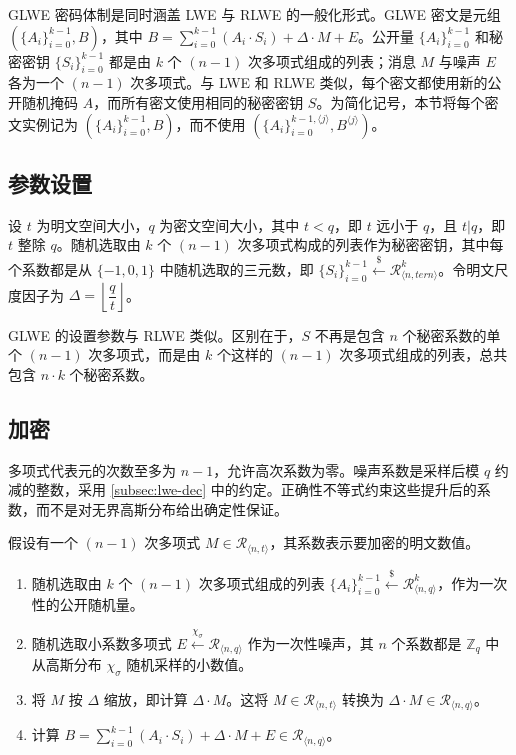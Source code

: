 GLWE 密码体制是同时涵盖 LWE 与 RLWE 的一般化形式。GLWE 密文是元组 $(\{A_i\}_{i=0}^{k-1}, B)$，其中 $B = \sum\limits_{i=0}^{k-1}{(A_i \cdot S_i)} + \Delta \cdot M + E$。公开量 $\{A_i\}_{i=0}^{k-1}$ 和秘密密钥 $\{S_i\}_{i=0}^{k-1}$ 都是由 $k$ 个 $(n-1)$ 次多项式组成的列表；消息 $M$ 与噪声 $E$ 各为一个 $(n-1)$ 次多项式。与 LWE 和 RLWE 类似，每个密文都使用新的公开随机掩码 $A$，而所有密文使用相同的秘密密钥 $S$。为简化记号，本节将每个密文实例记为 $(\{A_i\}_{i=0}^{k-1}, B)$，而不使用 $(\{A_i\}_{i=0}^{k-1, \langle j \rangle}, B^{\langle j \rangle})$。




\subsection{参数设置}
设 $t$ 为明文空间大小，$q$ 为密文空间大小，其中 $t < q$，即 $t$ 远小于 $q$，且 $t | q$，即 $t$ 整除 $q$。随机选取由 $k$ 个 $(n-1)$ 次多项式构成的列表作为秘密密钥，其中每个系数都是从 $\{-1, 0, 1\}$ 中随机选取的三元数，即 $\{S_i\}_{i=0}^{k-1} \xleftarrow{\$} \mathcal{R}_{\langle n, \textit{tern} \rangle}^k$。令明文尺度因子为 $\Delta = \left\lfloor\dfrac{q}{t}\right\rfloor$。

GLWE 的设置参数与 RLWE 类似。区别在于，$S$ 不再是包含 $n$ 个秘密系数的单个 $(n-1)$ 次多项式，而是由 $k$ 个这样的 $(n-1)$ 次多项式组成的列表，总共包含 $n \cdot k$ 个秘密系数。


\subsection{加密}
\label{subsec:glwe-enc}

多项式代表元的次数至多为 $n-1$，允许高次系数为零。噪声系数是采样后模 $q$ 约减的整数，采用 \autoref{subsec:lwe-dec} 中的约定。正确性不等式约束这些提升后的系数，而不是对无界高斯分布给出确定性保证。

假设有一个 $(n-1)$ 次多项式 $M \in \mathcal{R}_{\langle n, t \rangle}$，其系数表示要加密的明文数值。


\begin{enumerate}
\item 随机选取由 $k$ 个 $(n-1)$ 次多项式组成的列表 $\{A_i\}_{i=0}^{k-1} \xleftarrow{\$} \mathcal{R}_{\langle n,q \rangle}^{k}$，作为一次性的公开随机量。
\item 随机选取小系数多项式 $E \xleftarrow{\chi_\sigma} \mathcal{R}_{\langle n,q \rangle}$ 作为一次性噪声，其 $n$ 个系数都是 $\mathbb{Z}_q$ 中从高斯分布 $\chi_\sigma$ 随机采样的小数值。
\item 将 $M$ 按 $\Delta$ 缩放，即计算 $\Delta \cdot M$。这将 $M \in \mathcal{R}_{\langle n, t \rangle}$ 转换为 $\Delta \cdot M \in \mathcal{R}_{\langle n,q \rangle}$。
\item 计算 $B = \sum\limits_{i=0}^{k-1}{(A_i \cdot S_i)} + \Delta \cdot M + E \in \mathcal{R}_{\langle n,q \rangle}$。
\end{enumerate}


